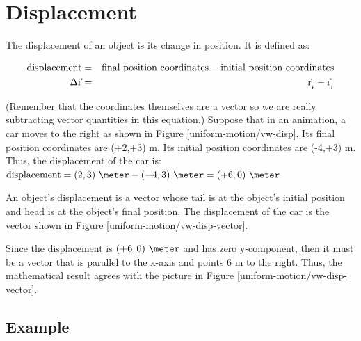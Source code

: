 
\section*{Displacement}

The displacement of an object is its change in position. It is defined as:

\begin{eqnarray*}
	\mbox{displacement} & = & \mbox{final position coordinates} - \mbox{initial position coordinates} \\
	\Delta \vec{\mathrm{r}} & = & \vec{\mathrm{r}}_{_{_{\mbox{\tiny{f}}}}} - \vec{\mathrm{r}}_{_{_{\mbox{\tiny{i}}}}} \\
\end{eqnarray*}

\noindent
(Remember that the coordinates themselves are a vector so we are really subtracting vector quantities in this equation.)  Suppose that in an animation, a car moves to the right as shown in Figure \ref{uniform-motion/vw-disp}. Its final position coordinates are (+2,+3) m. Its initial position coordinates are (-4,+3) m. Thus, the displacement of the car is:  $\mbox{displacement} = (2,3)\ \meter - (-4,3)\ \meter = (+6,0) \ \m$



An object's displacement is a vector whose tail is at the object's initial position and head is at the object's final position. The displacement of the car is the vector shown in Figure \ref{uniform-motion/vw-disp-vector}.


Since the displacement is  $(+6,0) \ \m$ and has zero y-component, then it must be a vector that is parallel to the x-axis and points 6 m to the right. Thus, the mathematical result agrees with the picture in Figure \ref{uniform-motion/vw-disp-vector}.

\subsection*{Example}

